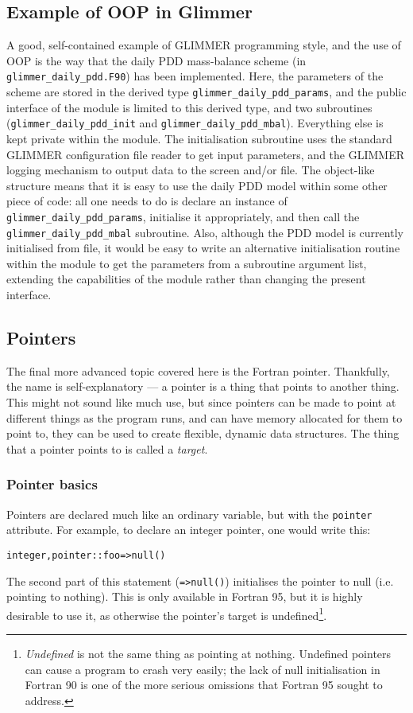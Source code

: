 \subsection{Example of OOP in Glimmer}
%
A good, self-contained example of GLIMMER programming style, and the use of
OOP is the way that the daily PDD mass-balance scheme (in
\texttt{glimmer\_daily\_pdd.F90}) has been implemented. Here, the parameters
of the scheme are stored in the derived type
\texttt{glimmer\_daily\_pdd\_params}, and the public interface of the module
is limited to this derived type, and two subroutines
(\texttt{glimmer\_daily\_pdd\_init} and
\texttt{glimmer\_daily\_pdd\_mbal}). Everything else is kept private within
the module. The initialisation subroutine uses the standard GLIMMER configuration
file reader to get input parameters, and the GLIMMER logging mechanism to
output data to the screen and/or file. The object-like structure means that it
is easy to use the daily PDD model within some other piece of code: all one
needs to do is declare an instance of \texttt{glimmer\_daily\_pdd\_params},
initialise it appropriately, and then call the
\texttt{glimmer\_daily\_pdd\_mbal} subroutine. Also, although the PDD model is
currently initialised from file, it would be easy to write an
alternative initialisation routine within the module to get the parameters
from a subroutine argument list, extending the capabilities of the module
rather than changing the present interface.
%
\subsection{Pointers}
%
The final more advanced topic covered here is the Fortran pointer. Thankfully,
the name is self-explanatory --- a pointer is a thing that points to another
thing. This might not sound like much use, but since pointers can be made to
point at different things as the program runs, and can have memory allocated
for them to point to, they can be used to create flexible, dynamic data
structures. The thing that a pointer points to is called a \emph{target}.
%
\subsubsection{Pointer basics}
%
Pointers are declared much like an ordinary variable, but with the \texttt{pointer}
attribute. For example, to declare an integer pointer, one would write this:
%
\begin{alltt}
    integer, pointer :: foo => null()
\end{alltt}
%
The second part of this statement (\texttt{=>null()}) initialises the pointer
to null (i.e. pointing to nothing). This is only available in Fortran 95, but
it is highly desirable to use it, as otherwise the pointer's target is
undefined\footnote{\emph{Undefined} is not the same thing as pointing at
  nothing. Undefined pointers can cause a program to crash very easily; the
  lack of null initialisation in Fortran 90 is one of the more serious
  omissions that Fortran 95 sought to address.}.

